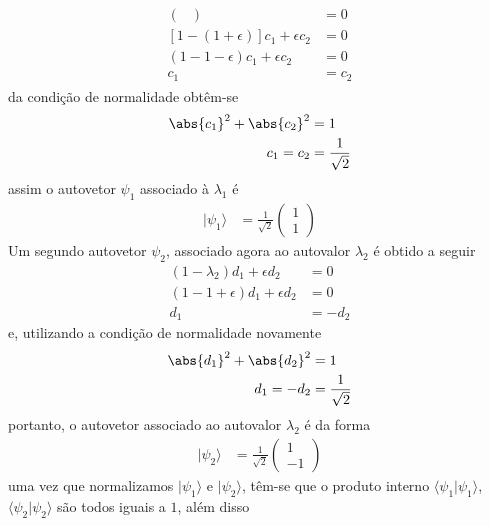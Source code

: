\begin{prob}
\begin{sol}
\begin{enumerate}[label=\alph *)]
\begin{align}
\begin{split}
\begin{pmatrix}
								\end{pmatrix} &= 0\\
								\left[1-\left(1+\epsilon\right)\right]c_{1}+\epsilon c_{2} &=0\\
								\left(1-1-\epsilon\right)c_{1}+\epsilon c_{2} &= 0\\
								c_{1} &= c_{2}
							\end{split}
						\end{align}
						da condição de normalidade obtêm-se
						\begin{align}
								\begin{split}
									\abs{c_{1}}^{2}+\abs{c_{2}}^{2} &= 1\\
									c_{1}=c_{2} &= \frac{1}{\sqrt{2}}
								\end{split}
						\end{align}
						assim o autovetor $\psi_{1}$ associado à $\lambda_{1}$ é
						\begin{align}
							|{\psi_{1}}\rangle &=\frac{1}{\sqrt{2}}
							\begin{pmatrix}
								1 \\
								1
							\end{pmatrix}
						\end{align}
						Um segundo autovetor $\psi_{2}$, associado agora ao autovalor $\lambda_{2}$ é obtido a seguir
						\begin{align}
							\left(1-\lambda_{2}\right)d_{1}+\epsilon d_{2} &= 0\\
							\left(1-1+\epsilon\right)d_{1}+\epsilon d_{2} &= 0\\
							d_{1} &= -d_{2}
						\end{align}
						e, utilizando a condição de normalidade novamente
						\begin{align}
							\abs{d_{1}}^{2}+\abs{d_{2}}^{2} &= 1\\
							d_{1}=-d_{2} &= \frac{1}{\sqrt{2}}
						\end{align}
						portanto, o autovetor associado ao autovalor $\lambda_{2}$ é da forma
						\begin{align}
							|{\psi_{2}}\rangle &= \frac{1}{\sqrt{2}}
							\begin{pmatrix}
								1 \\
								-1
							\end{pmatrix}
						\end{align}
						uma vez que normalizamos $|{\psi_{1}}\rangle$ e $|{\psi_{2}}\rangle$, têm-se que o produto interno $\langle{\psi_1}|{\psi_{1}}\rangle$, $\langle{\psi_{2}}|{\psi_{2}}\rangle$ são todos iguais a $1$, além disso

\end{enumerate}
\end{sol}
\end{prob}
